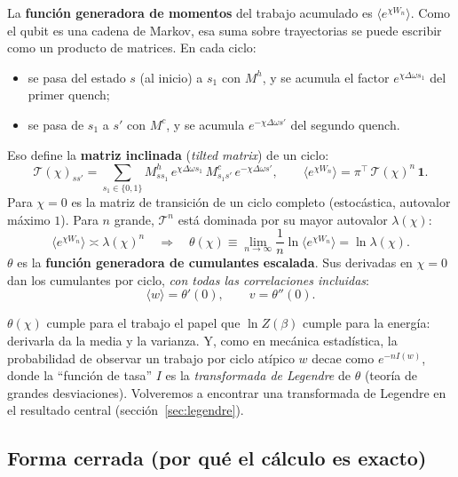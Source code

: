 La \textbf{función generadora de momentos} del trabajo acumulado es
$\langle e^{\chi W_n}\rangle$. Como el qubit es una cadena de Markov, esa suma sobre trayectorias
se puede escribir como un producto de matrices. En cada ciclo:
\begin{itemize}
\item se pasa del estado $s$ (al inicio) a $s_1$ con $M^h$, y se acumula el factor
  $e^{\chi\Delta\omega s_1}$ del primer quench;
\item se pasa de $s_1$ a $s'$ con $M^c$, y se acumula $e^{-\chi\Delta\omega s'}$ del segundo quench.
\end{itemize}
Eso define la \textbf{matriz inclinada} (\emph{tilted matrix}) de un ciclo:
\begin{equation}
\mathcal{T}(\chi)_{s s'} = \sum_{s_1\in\{0,1\}} M^h_{s s_1}\,e^{\chi\Delta\omega s_1}\,M^c_{s_1 s'}\,e^{-\chi\Delta\omega s'} ,
\qquad
\langle e^{\chi W_n}\rangle = \pi^{\top}\,\mathcal{T}(\chi)^n\,\mathbf{1} .
\end{equation}
Para $\chi = 0$ es la matriz de transición de un ciclo completo (estocástica, autovalor máximo
$1$). Para $n$ grande, $\mathcal{T}^n$ está dominada por su mayor autovalor $\lambda(\chi)$:
\begin{equation}
\langle e^{\chi W_n}\rangle \asymp \lambda(\chi)^n
\quad\Longrightarrow\quad
\theta(\chi) \equiv \lim_{n\to\infty}\frac{1}{n}\ln\langle e^{\chi W_n}\rangle = \ln\lambda(\chi).
\end{equation}
$\theta$ es la \textbf{función generadora de cumulantes escalada}. Sus derivadas en $\chi=0$ dan los
cumulantes por ciclo, \emph{con todas las correlaciones incluidas}:
\begin{equation}
\langle w\rangle = \theta'(0), \qquad v = \theta''(0).
\end{equation}

\begin{idea}
$\theta(\chi)$ cumple para el trabajo el papel que $\ln Z(\beta)$ cumple para la energía: derivarla
da la media y la varianza. Y, como en mecánica estadística, la probabilidad de observar un trabajo
por ciclo atípico $w$ decae como $e^{-n I(w)}$, donde la ``función de tasa'' $I$ es la
\emph{transformada de Legendre} de $\theta$ (teoría de grandes desviaciones). Volveremos a encontrar
una transformada de Legendre en el resultado central (sección~\ref{sec:legendre}).
\end{idea}

\subsection{Forma cerrada (por qué el cálculo es exacto)}

